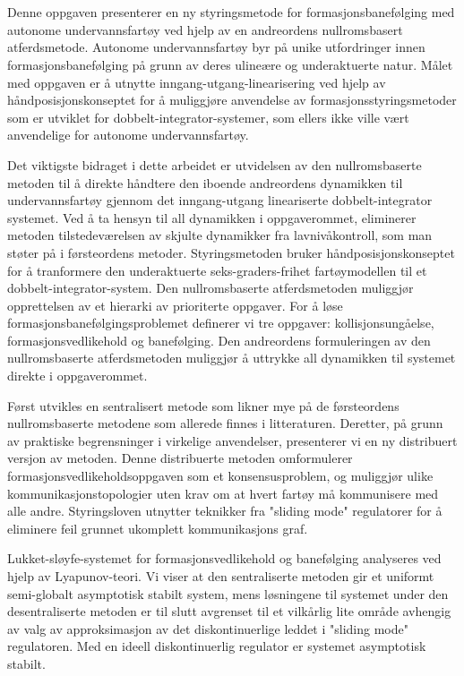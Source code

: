 \chapter*{\norwegianabstractname}
%
Denne oppgaven presenterer en ny styringsmetode for formasjonsbanefølging med autonome undervannsfartøy ved hjelp av en andreordens nullromsbasert atferdsmetode. Autonome undervannsfartøy byr på unike utfordringer innen formasjonsbanefølging på grunn av deres ulineære og underaktuerte natur. Målet med oppgaven er å utnytte inngang-utgang-linearisering ved hjelp av håndposisjonskonseptet for å muliggjøre anvendelse av formasjonsstyringsmetoder som er utviklet for dobbelt-integrator-systemer, som ellers ikke ville vært anvendelige for autonome undervannsfartøy.

Det viktigste bidraget i dette arbeidet er utvidelsen av den nullromsbaserte metoden til å direkte håndtere den iboende andreordens dynamikken til undervannsfartøy gjennom det inngang-utgang lineariserte dobbelt-integrator systemet. Ved å ta hensyn til all dynamikken i oppgaverommet, eliminerer metoden tilstedeværelsen av skjulte dynamikker fra lavnivåkontroll, som man støter på i førsteordens metoder. Styringsmetoden bruker håndposisjonskonseptet for å tranformere den underaktuerte seks-graders-frihet fartøymodellen til et dobbelt-integrator-system. Den nullromsbaserte atferdsmetoden muliggjør opprettelsen av et hierarki av prioriterte oppgaver. For å løse formasjonsbanefølgingsproblemet definerer vi tre oppgaver: kollisjonsungåelse, formasjonsvedlikehold og banefølging. Den andreordens formuleringen av den nullromsbaserte atferdsmetoden muliggjør å uttrykke all dynamikken til systemet direkte i oppgaverommet. 

Først utvikles en sentralisert metode som likner mye på de førsteordens nullromsbaserte metodene som allerede finnes i litteraturen. Deretter, på grunn av praktiske begrensninger i virkelige anvendelser, presenterer vi en ny distribuert versjon av metoden. Denne distribuerte metoden omformulerer formasjonsvedlikeholdsoppgaven som et konsensusproblem, og muliggjør ulike kommunikasjonstopologier uten krav om at hvert fartøy må kommunisere med alle andre. Styringsloven utnytter teknikker fra "sliding mode" regulatorer for å eliminere feil grunnet ukomplett kommunikasjons graf.

Lukket-sløyfe-systemet for formasjonsvedlikehold og banefølging analyseres ved hjelp av Lyapunov-teori. Vi viser at den sentraliserte metoden gir et uniformt semi-globalt asymptotisk stabilt system, mens løsningene til systemet under den desentraliserte metoden er til slutt avgrenset til et vilkårlig lite område avhengig av valg av approksimasjon av det diskontinuerlige leddet i "sliding mode" regulatoren. Med en ideell diskontinuerlig regulator er systemet asymptotisk stabilt.


